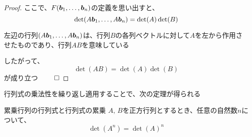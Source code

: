 \documentclass[../../../topic_linear-algebra]{subfiles}
\begin{document}
\begin{proof}
  \br

  ここで、$F(\vb*{b}_1, \ldots, \vb*{b}_n)$の定義を思い出すと、
  \begin{equation*}
    \det(A\vb*{b}_1, \ldots, A\vb*{b}_n) = \det(A) \det(B)
  \end{equation*}

  左辺の行列$(A\vb*{b}_1, \ldots, A\vb*{b}_n)$は、行列$B$の各列ベクトルに対して$A$を左から作用させたものであり、行列$AB$を意味している

  \br

  したがって、
  \begin{equation*}
    \det(AB) = \det(A) \det(B)
  \end{equation*}
  が成り立つ $\qed$
\end{proof}

\sectionline

行列式の乗法性を繰り返し適用することで、次の定理が得られる

\begin{theorem*}{累乗行列の行列式と行列式の累乗}
  $A,\,B$を正方行列とするとき、任意の自然数$n$について、
  \begin{equation*}
    \det(A^n) = \det(A)^n
  \end{equation*}
\end{theorem*}
\end{document}
